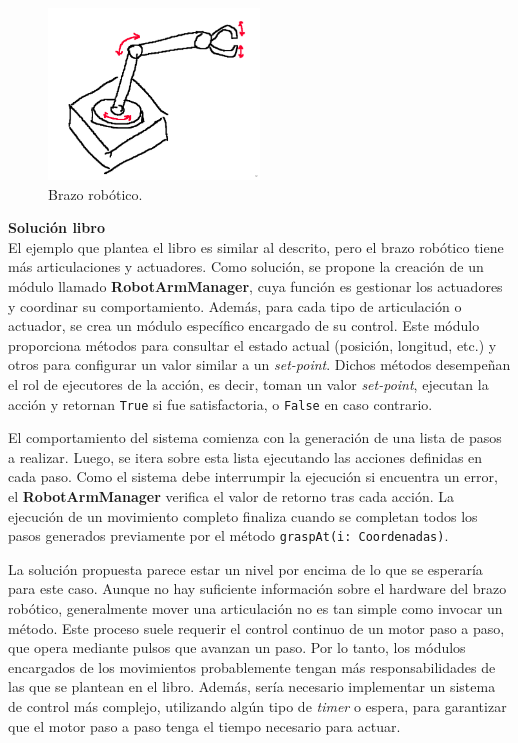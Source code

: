 \begin{figure}[h]
\caption{Brazo robótico.}
\begin{centering}
{\includegraphics[width=0.5\textwidth]{Screenshot from 2024-08-29 18-44-50.png}\par}
\end{centering}
\end{figure}

\noident
\textbf{Solución libro}
\\
\noident
El ejemplo que plantea el libro es similar al descrito, pero el brazo robótico tiene más articulaciones y actuadores. Como solución, se propone la creación de un módulo llamado \textbf{RobotArmManager}, cuya función es gestionar los actuadores y coordinar su comportamiento. Además, para cada tipo de articulación o actuador, se crea un módulo específico encargado de su control. Este módulo proporciona métodos para consultar el estado actual (posición, longitud, etc.) y otros para configurar un valor similar a un \textit{set-point}. Dichos métodos desempeñan el rol de ejecutores de la acción, es decir, toman un valor \textit{set-point}, ejecutan la acción y retornan \verb|True| si fue satisfactoria, o \verb|False| en caso contrario.

El comportamiento del sistema comienza con la generación de una lista de pasos a realizar. Luego, se itera sobre esta lista ejecutando las acciones definidas en cada paso. Como el sistema debe interrumpir la ejecución si encuentra un error, el \textbf{RobotArmManager} verifica el valor de retorno tras cada acción. La ejecución de un movimiento completo finaliza cuando se completan todos los pasos generados previamente por el método \verb|graspAt(i: Coordenadas)|.

La solución propuesta parece estar un nivel por encima de lo que se esperaría para este caso. Aunque no hay suficiente información sobre el hardware del brazo robótico, generalmente mover una articulación no es tan simple como invocar un método. Este proceso suele requerir el control continuo de un motor paso a paso, que opera mediante pulsos que avanzan un paso. Por lo tanto, los módulos encargados de los movimientos probablemente tengan más responsabilidades de las que se plantean en el libro. Además, sería necesario implementar un sistema de control más complejo, utilizando algún tipo de \textit{timer} o espera, para garantizar que el motor paso a paso tenga el tiempo necesario para actuar.

